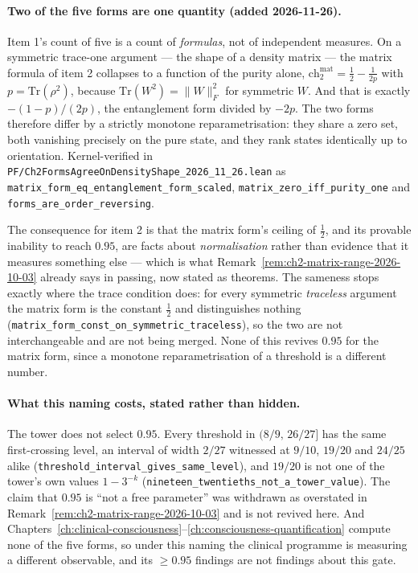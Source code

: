 \paragraph{Two of the five forms are one quantity (added 2026-11-26).}
Item 1's count of five is a count of \emph{formulas}, not of independent
measures. On a symmetric trace-one argument --- the shape of a density matrix
--- the matrix formula of item 2 collapses to a function of the purity alone,
$\text{ch}_2^{\mathrm{mat}} = \tfrac{1}{2} - \tfrac{1}{2p}$ with
$p = \mathrm{Tr}(\rho^2)$, because $\mathrm{Tr}(W^2) = \|W\|_F^2$ for symmetric
$W$. And that is exactly $-(1-p)/(2p)$, the entanglement form divided by $-2p$.
The two forms therefore differ by a strictly monotone reparametrisation: they
share a zero set, both vanishing precisely on the pure state, and they rank
states identically up to orientation. Kernel-verified in
\texttt{PF/Ch2FormsAgreeOnDensityShape\_2026\_11\_26.lean} as
\texttt{matrix\_form\_eq\_entanglement\_form\_scaled},
\texttt{matrix\_zero\_iff\_purity\_one} and
\texttt{forms\_are\_order\_reversing}.

The consequence for item 2 is that the matrix form's ceiling of $\tfrac{1}{2}$,
and its provable inability to reach $0.95$, are facts about \emph{normalisation}
rather than evidence that it measures something else --- which is what
Remark~\ref{rem:ch2-matrix-range-2026-10-03} already says in passing, now
stated as theorems. The sameness stops exactly where the trace condition does:
for every symmetric \emph{traceless} argument the matrix form is the constant
$\tfrac{1}{2}$ and distinguishes nothing
(\texttt{matrix\_form\_const\_on\_symmetric\_traceless}), so the two are not
interchangeable and are not being merged. None of this revives $0.95$ for the
matrix form, since a monotone reparametrisation of a threshold is a different
number.

\paragraph{What this naming costs, stated rather than hidden.}
The tower does not select $0.95$. Every threshold in $(8/9,\,26/27]$ has the
same first-crossing level, an interval of width $2/27$ witnessed at $9/10$,
$19/20$ and $24/25$ alike (\texttt{threshold\_interval\_gives\_same\_level}),
and $19/20$ is not one of the tower's own values $1 - 3^{-k}$
(\texttt{nineteen\_twentieths\_not\_a\_tower\_value}). The claim that $0.95$ is
``not a free parameter'' was withdrawn as overstated in
Remark~\ref{rem:ch2-matrix-range-2026-10-03} and is not revived here. And
Chapters~\ref{ch:clinical-consciousness}--\ref{ch:consciousness-quantification}
compute none of the five forms, so under this naming the clinical programme is
measuring a different observable, and its $\geq 0.95$ findings are not findings
about this gate.

